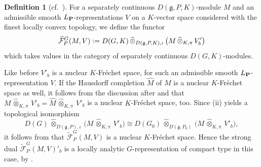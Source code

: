 \documentclass[a4paper, reqno, 10pt]{amsart}
\theoremstyle{definition}
\newtheorem{definition}[theorem]{Definition}
\numberwithin{equation}{section}
\newcommand{\cotimes}[1]{{\,\widehat{\otimes}_{#1}\,}}
\newcommand{\defeq}{\vcentcolon=}
\newcommand{\indotimes}{{\,\otimes_{K,\iota}\,}}
\newcommand{\mto}{\mapsto}
\newcommand{\projotimes}{{\,\otimes_{K,\pi}\,}}
\newcommand{\projcotimes}{{\,\widehat{\otimes}_{K,\pi}\,}}
\newcommand{\ra}{\rightarrow}
\newcommand{\CF}{{\mathcal {F}}}
\newcommand{\bP}{{\mathrm{\bf P}}}
\newcommand{\Fg}{{\mathfrak {g}}}
\begin{document}
\begin{definition}[{cf.\ \cite[Def.\ 4.2.1]{AgrawalStrauch22FromCatOLocAnRep}}]
	For a separately continuous $D(\Fg,P,K)$-module $M$ and an admissible smooth $L_\bP$-representations $V$ on a $K$-vector space considered with the finest locally convex topology, we define the functor
	\begin{equation*}
		\widetilde{\CF}^G_P(M,V) \defeq  D(G,K) \cotimes{D(\Fg,P,K), \iota} \big(M \projcotimes V'_b \big) 
	\end{equation*}
	which takes values in the category of separately continuous $D(G, K)$-modules.
\end{definition}

Like before $V'_b$ is a nuclear $K$-Fr\'echet space, for such an admissible smooth $L_\bP$-re\-pre\-sen\-tation $V$.
If the Hausdorff completion $\widehat{M}$ of $M$ is a nuclear $K$-Fr\'echet space as well, it follows from the discussion after \cite[Prop.\ 17.6]{Schneider02NonArchFunctAna} and \cite[Prop.\ 19.11, Prop.\ 20.4]{Schneider02NonArchFunctAna} that $M \projcotimes V'_b = \widehat{M} \projcotimes V'_b $ is a nuclear $K$-Fr\'echet space, too.
Since  (ii) yields a topological isomorphism
\begin{equation*}
	D(G) \cotimes{D(\Fg,P), \iota} \big(M \projcotimes V'_b \big) \cong D(G_0) \cotimes{D(\Fg,P_0)} \big(M \projcotimes V'_b \big) ,
\end{equation*}
it follows from \cite[Prop.\ 19.4 (ii)]{Schneider02NonArchFunctAna} that $\widetilde{\CF}^G_P(M,V)$ is a nuclear $K$-Fr\'echet space.
Hence the strong dual $\widetilde{\CF}^G_P(M,V)'_b$ is a locally analytic $G$-representation of compact type in this case, by .
\end{document}
